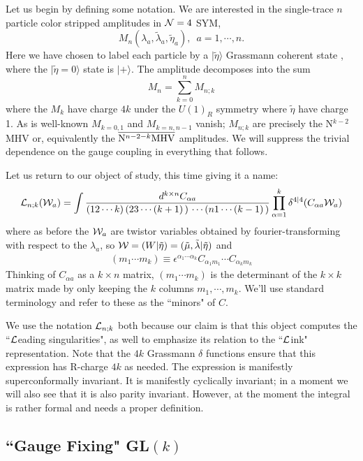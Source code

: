 \documentclass[12pt]{article}
\newcommand{\be}{\begin{eqnarray}}
\newcommand{\ee}{\end{eqnarray}}
\begin{document}
Let us begin by defining some notation. We are interested in the single-trace $n$ particle color stripped amplitudes in ${\cal N} = 4$ SYM,
\begin{equation}
M_n({\lambda_a,\tilde \lambda_a, \tilde \eta_a}), \,\,\, a = 1, \cdots, n.
\end{equation}
Here we have chosen to label each particle by a $|\tilde \eta \rangle$ Grassmann coherent state \cite{Nair:1988bq, simplest}, where the $|\tilde \eta = 0\rangle$ state is $|+
\rangle$. The amplitude decomposes into the sum
\begin{equation}
M_n = \sum_{k = 0}^{n} M_{n;k}
\end{equation}
where the $M_k$ have charge $4k$ under the $U(1)_R$ symmetry where $\tilde \eta$ have charge 1. As is well-known $M_{k=0,1}$ and $M_{k=n,n-1}$ vanish; $M_{n;k}$ are precisely the N$^{k-2}$MHV or, equivalently the $\overline{{\rm N}^{n - 2 - k}{\rm MHV}}$ amplitudes. We will suppress the trivial dependence on the gauge coupling in everything that follows.

Let us return to our object of study, this time giving it a name:
\be {\cal L}_{n;k}({\cal W}_a) = \int \frac{d^{k \times n} C_{\alpha
a}}{(12\cdots k) \, (23\cdots (k+1) \,) \, \cdots (n 1 \cdots (k-1)
\,)} \prod_{\alpha = 1}^k \delta^{4|4}(C_{\alpha a} {\cal W}_a) \ee
where as before the ${\cal W}_a$ are twistor variables  obtained by
fourier-transforming with respect to the $\lambda_a$, so ${\cal W} =
(W | \tilde \eta) = (\tilde \mu, \tilde \lambda| \tilde \eta)$ and
\be (m_1  \cdots m_k) \equiv \epsilon^{\alpha_1 \cdots \alpha_k}
C_{\alpha_1 m_1} \cdots C_{\alpha_k m_k} \ee Thinking of $C_{\alpha
a}$ as a $k \times n$ matrix, $(m_1 \cdots m_k)$ is the determinant
of the $k \times k$ matrix made by only keeping the $k$ columns
$m_1, \cdots, m_k$. We'll use standard terminology and refer to
these as the ``minors" of $C$.

We use the notation ${\cal L}_{n;k}$ both because our claim is that this object computes the ``${\cal L}$eading singularities", as well to emphasize its relation to the ``${\cal L}$ink" representation.
Note that the $4k$ Grassmann $\delta$ functions ensure that this expression has R-charge $4k$ as needed. The expression is manifestly superconformally invariant. It is manifestly cyclically
invariant; in a moment we will also see that it is also parity invariant. However, at the moment the integral is rather formal and needs a proper definition.

\subsection{``Gauge Fixing" GL$(k)$}
\end{document}
